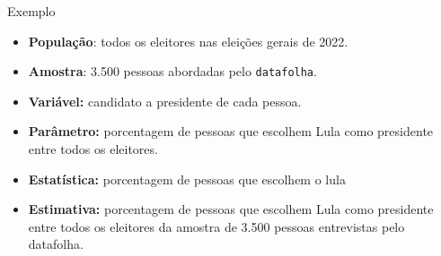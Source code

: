 \documentclass[
  10pt,
  ignorenonframetext,
]{beamer}
\providecommand{\tightlist}{%
  \setlength{\itemsep}{0pt}\setlength{\parskip}{0pt}}
\begin{document}
\begin{frame}[fragile]{Exemplo}
\protect\hypertarget{exemplo}{}
\begin{itemize}
\tightlist
\item
  \textbf{População}: todos os eleitores nas eleições gerais de 2022.
\item
  \textbf{Amostra}: 3.500 pessoas abordadas pelo \texttt{datafolha}.
\item
  \textbf{Variável:} candidato a presidente de cada pessoa.
\item
  \textbf{Parâmetro:} porcentagem de pessoas que escolhem Lula como
  presidente entre todos os eleitores.
\item
  \textbf{Estatística:} porcentagem de pessoas que escolhem o lula
\item
  \textbf{Estimativa:} porcentagem de pessoas que escolhem Lula como
  presidente entre todos os eleitores da amostra de 3.500 pessoas
  entrevistas pelo datafolha.
\end{itemize}
\end{frame}
\end{document}
